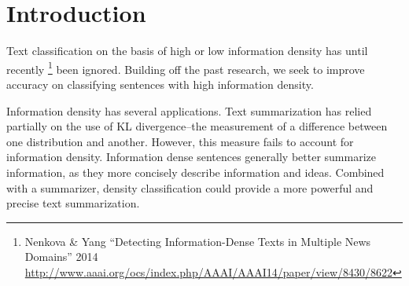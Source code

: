 \documentclass[
10pt, %
a4paper, %
oneside, %
headinclude,footinclude, %
BCOR5mm, %
]{scrartcl}
\title{\normalfont\spacedallcaps{CIS530 Final Report}}
\author{\spacedlowsmallcaps{Stuart Wagner \& Michael Woods}}
\date{}
\begin{document}

\renewcommand{\sectionmark}[1]{\markright{\spacedlowsmallcaps{#1}}}

\lehead{\mbox{\llap{\small\thepage\kern1em\color{halfgray} \vline}\color{halfgray}\hspace{0.5em}\rightmark\hfil}}

\pagestyle{scrheadings}


\maketitle

\setcounter{tocdepth}{2}



\section{Introduction}

Text classification on the basis of high or low information density has until
recently
\footnote{Nenkova \& Yang ``Detecting Information-Dense Texts in Multiple News Domains'' 2014 \newline 
\url{http://www.aaai.org/ocs/index.php/AAAI/AAAI14/paper/view/8430/8622}} 
been ignored. Building off the past research, we seek to improve accuracy on
classifying sentences with high information density.

Information density has several applications. Text summarization has relied
partially on the use of KL divergence--the measurement of a difference between
one distribution and another. However, this measure fails to account for
information density. Information dense sentences generally better summarize
information, as they more concisely describe information and ideas. Combined
with a summarizer, density classification could provide a more powerful and
precise text summarization.
\end{document}

